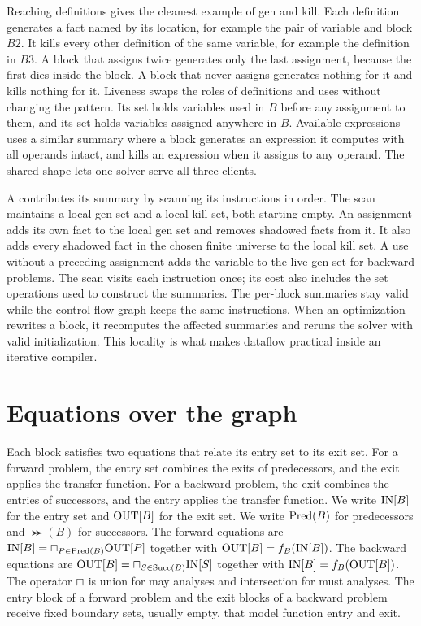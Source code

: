 Reaching definitions gives the cleanest example of gen and kill.
Each definition generates a fact named by its location, for example the pair of variable  and block $B2$.
It kills every other definition of the same variable, for example the definition in $B3$.
A block that assigns  twice generates only the last assignment, because the first dies inside the block.
A block that never assigns  generates nothing for it and kills nothing for it.
Liveness swaps the roles of definitions and uses without changing the pattern.
Its  set holds variables used in $B$ before any assignment to them, and its  set holds variables assigned anywhere in $B$.
Available expressions uses a similar summary where a block generates an expression it computes with all operands intact, and kills an expression when it assigns to any operand.
The shared shape lets one solver serve all three clients.

A  contributes its summary by scanning its instructions in order.
The scan maintains a local gen set and a local kill set, both starting empty.
An assignment adds its own fact to the local gen set and removes shadowed facts from it.
It also adds every shadowed fact in the chosen finite universe to the local kill set.
A use without a preceding assignment adds the variable to the live-gen set for backward problems.
The scan visits each instruction once; its cost also includes the set operations used to construct the summaries.
The per-block summaries stay valid while the control-flow graph keeps the same instructions.
When an optimization rewrites a block, it recomputes the affected summaries and reruns the solver with valid initialization.
This locality is what makes dataflow practical inside an iterative compiler.
\section{Equations over the graph}
\label{sec:ch09-equations}

Each block satisfies two equations that relate its entry set to its exit set.
For a forward problem, the entry set combines the exits of predecessors, and the exit applies the transfer function.
For a backward problem, the exit combines the entries of successors, and the entry applies the transfer function.
We write $\mathrm{IN}[B]$ for the entry set and $\mathrm{OUT}[B]$ for the exit set.
We write $\operatorname{Pred}(B)$ for predecessors and $\Succ(B)$ for successors.
The forward equations are $\mathrm{IN}[B] = \sqcap_{P \in \operatorname{Pred}(B)} \mathrm{OUT}[P]$ together with $\mathrm{OUT}[B] = f_{B}(\mathrm{IN}[B])$.
The backward equations are $\mathrm{OUT}[B] = \sqcap_{S \in \operatorname{Succ}(B)} \mathrm{IN}[S]$ together with $\mathrm{IN}[B] = f_{B}(\mathrm{OUT}[B])$.
The operator $\sqcap$ is union for may analyses and intersection for must analyses.
The entry block of a forward problem and the exit blocks of a backward problem receive fixed boundary sets, usually empty, that model function entry and exit.

